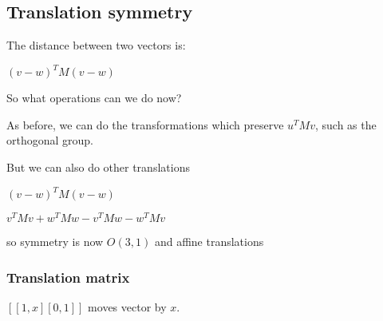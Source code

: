 
\subsection{Translation symmetry}

The distance between two vectors is:

\((v-w)^TM(v-w)\)

So what operations can we do now?

As before, we can do the transformations which preserve \(u^TMv\), such as the orthogonal group.

But we can also do other translations

\((v-w)^TM(v-w)\)

\(v^TMv+w^TMw-v^TMw-w^TMv\)

so symmetry is now \(O(3,1)\) and affine translations

\subsubsection{Translation matrix}

\([[1,x][0, 1]]\) moves vector by \(x\).


